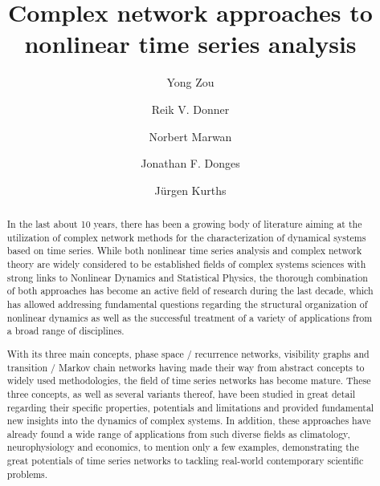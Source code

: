 \documentclass[3p,sort&compress]{elsarticle}
\begin{document}
\begin{frontmatter}

\title{Complex network approaches to nonlinear time series analysis}

\author[ECNU]{Yong Zou}
\address[ECNU]{Department of Physics, East China Normal University, Shanghai 200062, China}

\author[PIK]{Reik V. Donner}
\address[PIK]{Potsdam Institute for Climate Impact Research, P.\,O.~Box
60\,12\,03, 14412 Potsdam, Germany}

\author[PIK]{Norbert Marwan}

\author[PIK]{Jonathan F. Donges}

\author[PIK,UK,HU,RU1,RU2]{J\"urgen Kurths}
 \address[UK]{Institute for Complex Systems and Mathematical Biology, University
 of Aberdeen, Aberdeen AB243UE, United Kingdom}
 \address[HU]{Department of Physics, Humboldt University Berlin,
 Newtonstra{\ss}e 15, 12489 Berlin, Germany}
\address[RU1]{Department of Control Theory, Nizhny Novgorod State University,
Gagarin Avenue 23, 606950 Nizhny Novgorod, Russia} 
\address[RU2]{Institute of Applied Physics of the Russian Academy of Sciences,
603950 Nizhny Novgorod, Russia}


\begin{abstract}

In the last about 10 years, there has been a growing body of literature aiming
at the utilization of complex network methods for the characterization of
dynamical systems based on time series. While both nonlinear time series
analysis and complex network theory are widely considered to be established
fields of complex systems sciences with strong links to Nonlinear Dynamics and
Statistical Physics, the thorough combination of both approaches has become an
active field of research during the last decade, which has allowed addressing
fundamental questions regarding the structural organization of nonlinear
dynamics as well as the successful treatment of a variety of applications from a
broad range of disciplines.

With its three main concepts, phase space / recurrence networks, visibility
graphs and transition / Markov chain networks having made their way from
abstract concepts to widely used methodologies, the field of time series
networks has become mature. These three concepts, as well as several variants
thereof, have been studied in great detail regarding their specific properties,
potentials and limitations and provided fundamental new insights into the
dynamics of complex systems. In addition, these approaches have already found a
wide range of applications from such diverse fields as climatology,
neurophysiology and economics, to mention only a few examples, demonstrating the
great potentials of time series networks to tackling real-world contemporary
scientific problems.


\end{abstract}
\end{frontmatter}
\end{document}
